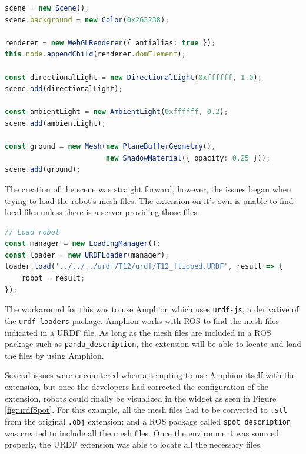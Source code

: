     \begin{lstlisting}[language=typescript]
scene = new Scene();
scene.background = new Color(0x263238);

renderer = new WebGLRenderer({ antialias: true });
this.node.appendChild(renderer.domElement);

const directionalLight = new DirectionalLight(0xffffff, 1.0);
scene.add(directionalLight);

const ambientLight = new AmbientLight(0xffffff, 0.2);
scene.add(ambientLight);

const ground = new Mesh(new PlaneBufferGeometry(), 
                        new ShadowMaterial({ opacity: 0.25 }));
scene.add(ground);
    \end{lstlisting}

    \noindent The creation of the scene was straight forward, however, the issues began when trying to load the robot's mesh files. The extension on it's own is unable to find local files unless there is a server providing those files. 
    
    \begin{lstlisting}[language=typescript]
// Load robot
const manager = new LoadingManager();
const loader = new URDFLoader(manager);
loader.load('../../../urdf/T12/urdf/T12_flipped.URDF', result => {
    robot = result;
});
    \end{lstlisting}

    \noindent The workaround for this was to use \href{https://github.com/RoboStack/amphion}{Amphion} which uses \href{https://github.com/rapyuta-robotics/urdf-js}{\texttt{urdf-js}}, a derivative of the \texttt{urdf-loaders} package. Amphion works with ROS to find the mesh files indicated in a URDF file. As long as the mesh files are included in a ROS package such as \texttt{panda\_description}, the extension will be able to locate and load the files by using Amphion. 

    Several issues were encountered when attempting to use Amphion itself with the extension, but once the developers had corrected the configuration of the extension, robots could finally be visualized in the widget as seen in Figure \ref{fig:urdfSpot}. For this example, all the mesh files had to be converted to \texttt{.stl} from the original \texttt{.obj} extension; and a ROS package called \texttt{spot\_description} was created to include all the mesh files. Once the environment was sourced properly, the URDF extension was able to locate all the necessary files.

